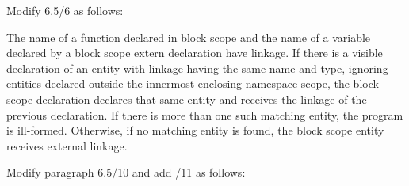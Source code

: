 \noindent
Modify 6.5/6 as follows:
\begin{std.txt}
\pnum[6]
The name of a function declared in block scope and the name of a
variable declared by a block scope extern declaration have linkage.
If there is a visible declaration of an entity with linkage having the
same name and type, ignoring entities declared outside the innermost
enclosing namespace scope, the block scope declaration declares that
same entity and receives the linkage of the previous declaration. 
If
there is more than one such matching entity, the program is
ill-formed. Otherwise, if no matching entity is found, the block scope
entity receives external linkage.
\end{std.txt}

\noindent
Modify paragraph 6.5/10 and add /11 as follows:
